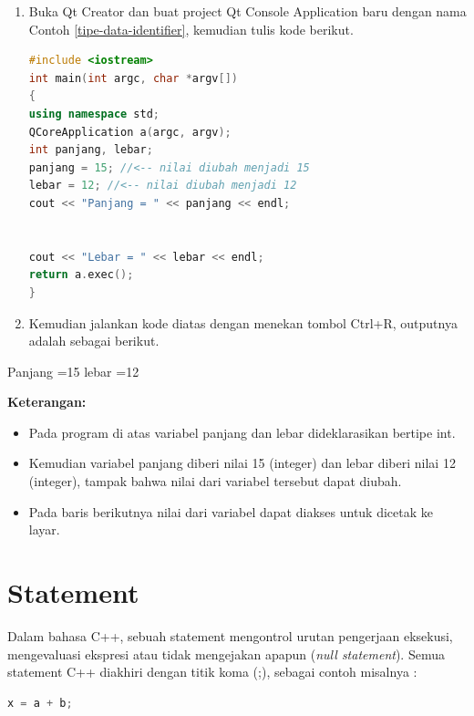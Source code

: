 \begin{enumerate}

\item
  Buka Qt Creator dan buat project Qt Console Application baru dengan
  nama Contoh \ref{tipe-data-identifier}, kemudian tulis kode berikut.

\begin{lstlisting}[language=c++, caption=Tipe data dan Identifier, label=tipe-data-identifier]
#include <iostream>
int main(int argc, char *argv[])
{
using namespace std;
QCoreApplication a(argc, argv);
int panjang, lebar;
panjang = 15; //<-- nilai diubah menjadi 15
lebar = 12; //<-- nilai diubah menjadi 12
cout << "Panjang = " << panjang << endl;


cout << "Lebar = " << lebar << endl;
return a.exec();
}
\end{lstlisting}
\item
  Kemudian jalankan kode diatas dengan menekan tombol Ctrl+R, outputnya
  adalah sebagai berikut.
\end{enumerate}
\begin{lcverbatim}
Panjang =15
lebar =12
\end{lcverbatim}


\textbf{Keterangan:}

\begin{itemize}

\item
  Pada program di atas variabel panjang dan lebar dideklarasikan bertipe
  int.
\item
  Kemudian variabel panjang diberi nilai 15 (integer) dan lebar diberi
  nilai 12 (integer), tampak bahwa nilai dari variabel tersebut dapat
  diubah.
\item
  Pada baris berikutnya nilai dari variabel dapat diakses untuk dicetak
  ke layar.
\end{itemize}

\section{Statement}\label{statement}

Dalam bahasa C++, sebuah statement mengontrol urutan pengerjaan
eksekusi, mengevaluasi ekspresi atau tidak mengejakan apapun (\emph{null
statement}). Semua statement C++ diakhiri dengan titik koma (;), sebagai
contoh misalnya :

\begin{lstlisting}[language=c++, numbers=none]
x = a + b;
\end{lstlisting}

